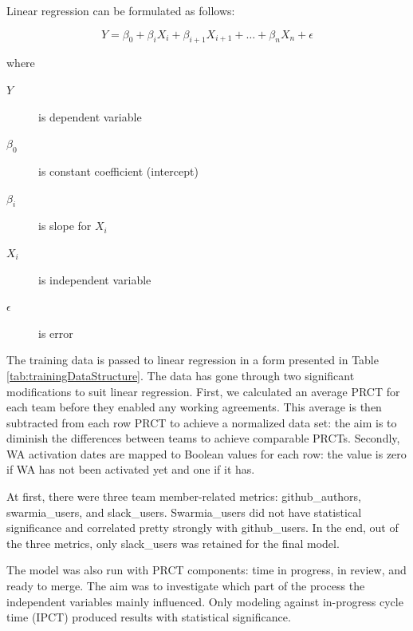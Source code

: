 Linear regression can be formulated as follows:

\begin{equation}
Y = \beta_0 + \beta_i X_i + \beta_{i+1} X_{i+1} + \ldots + \beta_n X_n + \epsilon
\end{equation}


where
\begin{description}
\item[$Y$] is dependent variable
\item[$\beta_0$] is constant coefficient (intercept)
\item[$\beta_i$] is slope for $X_i$
\item[$X_i$] is independent variable
\item[$\epsilon$] is error
\end{description}

The training data is passed to linear regression in a form presented in Table \ref{tab:trainingDataStructure}. The data has gone through two significant modifications to suit linear regression. First, we calculated an average PRCT for each team before they enabled any working agreements. This average is then subtracted from each row PRCT to achieve a normalized data set: the aim is to diminish the differences between teams to achieve comparable PRCTs. Secondly, WA activation dates are mapped to Boolean values for each row: the value is zero if WA has not been activated yet and one if it has.



At first, there were three team member-related metrics: github\_authors, swarmia\_users, and slack\_users. Swarmia\_users did not have statistical significance and correlated pretty strongly with github\_users. In the end, out of the three metrics, only slack\_users was retained for the final model.

The model was also run with PRCT components: time in progress, in review, and ready to merge. The aim was to investigate which part of the process the independent variables mainly influenced. Only modeling against in-progress cycle time (IPCT) produced results with statistical significance.  
